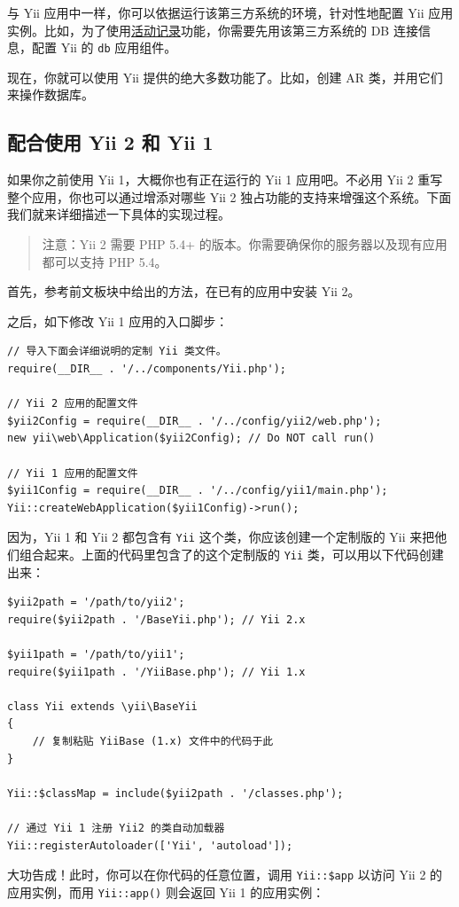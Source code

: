 与 Yii 应用中一样，你可以依据运行该第三方系统的环境，针对性地配置 Yii 应用实例。比如，为了使用\hyperref[db-active-record.md]{活动记录}功能，你需要先用该第三方系统的 DB 连接信息，配置 Yii 的 \lstinline|db| 应用组件。

现在，你就可以使用 Yii 提供的绝大多数功能了。比如，创建 AR 类，并用它们来操作数据库。

\subsection{配合使用 Yii 2 和 Yii 1 \label{tutorial-yii-integration.md::using-both-yii2-yii1}}
如果你之前使用 Yii 1，大概你也有正在运行的 Yii 1 应用吧。不必用 Yii 2 重写整个应用，你也可以通过增添对哪些
Yii 2 独占功能的支持来增强这个系统。下面我们就来详细描述一下具体的实现过程。

\begin{quote}注意：Yii 2 需要 PHP 5.4+ 的版本。你需要确保你的服务器以及现有应用都可以支持 PHP 5.4。

\end{quote}
首先，参考前文板块中给出的方法，在已有的应用中安装 Yii 2。

之后，如下修改 Yii 1 应用的入口脚步：

\lstset{language=php}\begin{lstlisting}
// 导入下面会详细说明的定制 Yii 类文件。
require(__DIR__ . '/../components/Yii.php');

// Yii 2 应用的配置文件
$yii2Config = require(__DIR__ . '/../config/yii2/web.php');
new yii\web\Application($yii2Config); // Do NOT call run()

// Yii 1 应用的配置文件
$yii1Config = require(__DIR__ . '/../config/yii1/main.php');
Yii::createWebApplication($yii1Config)->run();
\end{lstlisting}
因为，Yii 1 和 Yii 2 都包含有 \lstinline|Yii| 这个类，你应该创建一个定制版的 Yii 来把他们组合起来。上面的代码里包含了的这个定制版的 \lstinline|Yii| 类，可以用以下代码创建出来：

\lstset{language=php}\begin{lstlisting}
$yii2path = '/path/to/yii2';
require($yii2path . '/BaseYii.php'); // Yii 2.x

$yii1path = '/path/to/yii1';
require($yii1path . '/YiiBase.php'); // Yii 1.x

class Yii extends \yii\BaseYii
{
    // 复制粘贴 YiiBase (1.x) 文件中的代码于此
}

Yii::$classMap = include($yii2path . '/classes.php');

// 通过 Yii 1 注册 Yii2 的类自动加载器
Yii::registerAutoloader(['Yii', 'autoload']);
\end{lstlisting}
大功告成！此时，你可以在你代码的任意位置，调用 \lstinline|Yii::$app| 以访问 Yii 2 的应用实例，而用
\lstinline|Yii::app()| 则会返回 Yii 1 的应用实例：

